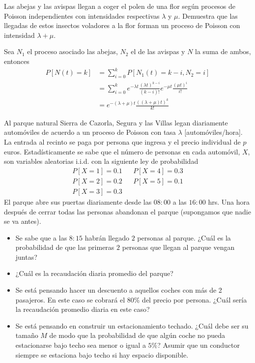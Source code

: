 \documentclass[twoside]{article}
\begin{document}
\newpage
\begin{ejercicio}{3}
Las abejas y las avispas llegan a coger el polen de una flor según procesos de Poisson independientes con intensidades respectivas $\lambda$ y $\mu$. Demuestra que las llegadas de estos insectos voladores a la flor forman un proceso de Poisson con intensidad $\lambda+\mu$.
\end{ejercicio}
\begin{solucion}
Sea $N_1$ el proceso asociado las abejas, $N_2$ el de las avispas y $N$ la suma de ambos, entonces
\begin{align*}
P[N(t)= k] &= \sum_{i=0}^k P[N_1(t)=k-i,N_2=i] \\
&= \sum_{i=0}^k e^{-\lambda t}\frac{(\lambda t)^{k-i}}{(k-i)!}e^{-\mu t}\frac{(\mu  t)^{i}}{i!}\\
&= e^{-(\lambda+\mu )t}\frac{((\lambda+\mu )t)^k}{k!}
\end{align*}
\end{solucion}
\newpage
\begin{ejercicio}{4}
Al parque natural Sierra de Cazorla, Segura y las Villas legan diariamente automóviles de acuerdo a un proceso de Poisson con tasa $\lambda$ [automóviles/hora]. La entrada al recinto se paga por persona que ingresa y el precio individual de $p$ euros. Estadísticamente se sabe que el número de personas en cada automóvil, $X$, son variables aleatorias i.i.d. con la siguiente ley de probabilidad
\begin{align*}
P[X=1]=0.1 & & P[X=4]=0.3\\
P[X=2]=0.2 & & P[X=5]=0.1\\
P[X=3]=0.3 & & 
\end{align*}
El parque abre sus puertas diariamente desde las $08:00$ a las $16:00$ hrs. Una hora después de cerrar todas las personas abandonan el parque (supongamos que nadie se va antes).
\begin{itemize}
\item Se sabe que a las $8:15$ habrán llegado $2$ personas al parque. ¿Cuál es la probabilidad de que las primeras $2$ personas que llegan al parque vengan juntas?
\item ¿Cuál es la recaudación diaria promedio del parque?
\item Se está pensando hacer un descuento a aquellos coches con más de 2 pasajeros. En este caso se cobrará el $80\%$ del precio por persona. ¿Cuál sería la recaudación promedio diaria en este caso?
\item Se está pensando en construir un estacionamiento techado. ¿Cuál debe ser su tamaño $M$ de modo que la probabilidad de que algún coche no pueda estacionarse bajo techo sea menor o igual a $5\%$? Asumir que un conductor siempre se estaciona bajo techo si hay espacio disponible. 
\end{itemize}
\end{ejercicio}
\end{document}
